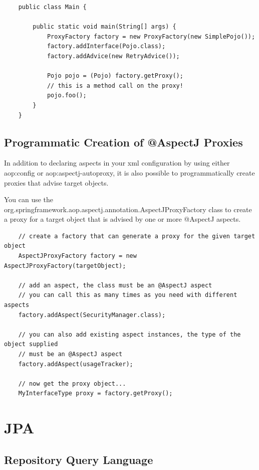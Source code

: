 \documentclass{scrartcl}
\begin{document}
\begin{lstlisting}
    public class Main {

        public static void main(String[] args) {
            ProxyFactory factory = new ProxyFactory(new SimplePojo());
            factory.addInterface(Pojo.class);
            factory.addAdvice(new RetryAdvice());

            Pojo pojo = (Pojo) factory.getProxy();
            // this is a method call on the proxy!
            pojo.foo();
        }
    }
\end{lstlisting}

\subsection{Programmatic Creation of @AspectJ Proxies}

In addition to declaring aspects in your xml configuration by using either aop:config or aop:aspectj-autoproxy, it is also possible to programmatically create proxies that advise target objects.

You can use the org.springframework.aop.aspectj.annotation.AspectJProxyFactory class to create a proxy for a target object that is advised by one or more @AspectJ aspects.

\begin{lstlisting}
    // create a factory that can generate a proxy for the given target object
    AspectJProxyFactory factory = new AspectJProxyFactory(targetObject);

    // add an aspect, the class must be an @AspectJ aspect
    // you can call this as many times as you need with different aspects
    factory.addAspect(SecurityManager.class);

    // you can also add existing aspect instances, the type of the object supplied
    // must be an @AspectJ aspect
    factory.addAspect(usageTracker);

    // now get the proxy object...
    MyInterfaceType proxy = factory.getProxy();
\end{lstlisting}



\section{JPA}
\subsection{Repository Query Language}
\end{document}
